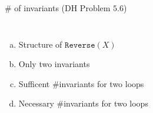 
\begin{frame}{}
  \begin{exampleblock}{\# of invariants (DH Problem $5.6$)}
    \begin{columns}
	\begin{enumerate}[(a)]
	  \setlength{\itemsep}{8pt}
	  \item Structure of $\texttt{Reverse}(X)$
	  \item Only two invariants
	  \item Sufficent \#invariants for two loops
	  \item Necessary \#invariants for two loops
	\end{enumerate}
    \end{columns}
  \end{exampleblock}
\end{frame}

\begin{frame}{}
\end{frame}
